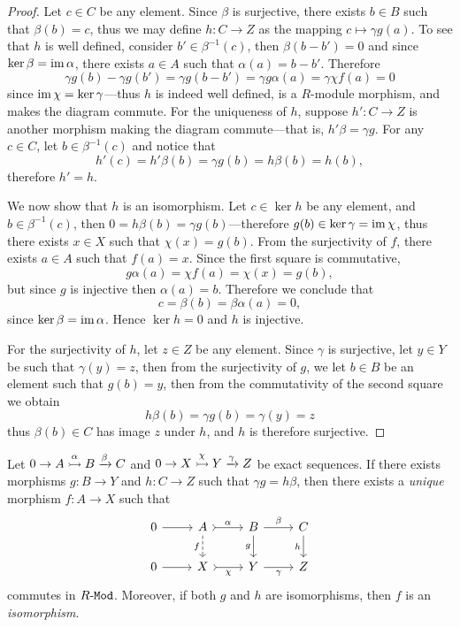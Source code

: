 \begin{proof}
Let \(c \in C\) be any element. Since \(\beta\) is surjective, there exists
\(b \in B\) such that \(\beta(b) = c\), thus we may define \(h: C \to Z\) as the
mapping \(c \mapsto \gamma g(a)\). To see that \(h\) is well defined, consider
\(b' \in \beta^{-1}(c)\), then \(\beta(b - b') = 0\) and since \(\ker \beta =
\operatorname{im} \alpha\), there exists \(a \in A\) such that \(\alpha(a) = b -
b'\). Therefore
\[
\gamma g(b) - \gamma g(b') = \gamma g(b - b')
= \gamma g \alpha(a) = \gamma \chi f(a)
= 0
\]
since \(\operatorname{im} \chi = \ker \gamma\)---thus \(h\) is indeed well defined, is a
\(R\)-module morphism, and makes the diagram commute. For the uniqueness of
\(h\), suppose \(h': C \to Z\) is another morphism making the diagram
commute---that is, \(h' \beta = \gamma g\). For any \(c \in C\), let
\(b \in \beta^{-1}(c)\) and notice that
\[
h'(c) = h'\beta(b) = \gamma g(b) = h \beta(b) = h(b),
\]
therefore \(h' = h\).

We now show that \(h\) is an isomorphism. Let \(c \in \ker h\) be any element,
and \(b \in \beta^{-1}(c)\), then \(0 = h \beta(b) = \gamma g(b)\)---therefore
\(g(b) \in \ker \gamma = \operatorname{im} \chi\), thus there exists \(x \in X\) such that
\(\chi(x) = g(b)\). From the surjectivity of \(f\), there exists \(a \in A\)
such that \(f(a) = x\). Since the first square is commutative,
\[
g \alpha(a) = \chi f(a) = \chi(x) = g(b),
\]
but since \(g\) is injective then \(\alpha(a) = b\). Therefore we conclude that
\[
c = \beta(b) = \beta \alpha(a) = 0,
\]
since \(\ker \beta = \operatorname{im} \alpha\). Hence \(\ker h = 0\) and \(h\) is injective.

For the surjectivity of \(h\), let \(z \in Z\) be any element. Since \(\gamma\)
is surjective, let \(y \in Y\) be such that \(\gamma(y) = z\), then from the
surjectivity of \(g\), we let \(b \in B\) be an element such that \(g(b) = y\),
then from the commutativity of the second square we obtain
\[
h \beta(b) = \gamma g(b) = \gamma(y) = z
\]
thus \(\beta(b) \in C\) has image \(z\) under \(h\), and \(h\) is therefore
surjective.
\end{proof}

\begin{proposition}
\label{prop:unique-isomorphism-exact-sequences-left}
Let \(0 \to A \overset{\alpha}{\rightarrowtail} B \xrightarrow \beta C\) and
\(0 \to X \overset{\chi}{\rightarrowtail} Y \xrightarrow \gamma Z\) be exact sequences. If
there exists morphisms \(g: B \to Y\) and \(h: C \to Z\) such that
\(\gamma g =h \beta\), then there exists a \emph{unique} morphism \(f: A \to X\)
such that
\[
\begin{tikzcd}
0 \ar[r]
&A \ar[r, tail, "\alpha"] \ar[d, dashed, "f"']
&B \ar[r, "\beta"] \ar[d, "g"']
&C \ar[d, "h"']
\\
0 \ar[r]
&X \ar[r, tail, "\chi"']
&Y \ar[r, "\gamma"']
&Z
\end{tikzcd}
\]
commutes in \({R\text{-}\texttt{Mod}}\). Moreover, if both \(g\) and \(h\) are isomorphisms,
then \(f\) is an \emph{isomorphism}.
\end{proposition}

